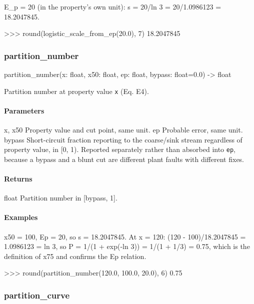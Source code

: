 \documentclass[10pt,a4paper,twoside]{report}
\begin{document}
E\_p = 20 (in the property's own unit): s = 20/ln 3 = 20/1.0986123 = 18.2047845.

\begin{doctestblock}
>>> round(logistic_scale_from_ep(20.0), 7)
18.2047845
\end{doctestblock}

\subsubsection*{partition\_number}

\begin{verbatimsmall}
partition_number(x: float, x50: float, ep: float, bypass: float=0.0) -> float
\end{verbatimsmall}

Partition number at property value \texttt{x} (Eq. E4).

\paragraph*{Parameters}

x, x50 Property value and cut point, same unit. ep Probable error, same unit. bypass Short-circuit fraction reporting to the coarse/sink stream regardless of property value, in [0, 1). Reported separately rather than absorbed into \texttt{ep}, because a bypass and a blunt cut are different plant faults with different fixes.

\paragraph*{Returns}

float Partition number in [bypass, 1].

\paragraph*{Examples}

x50 = 100, Ep = 20, so s = 18.2047845. At x = 120: (120 - 100)/18.2047845 = 1.0986123 = ln 3, so P = 1/(1 + exp(-ln 3)) = 1/(1 + 1/3) = 0.75, which is the definition of x75 and confirms the Ep relation.

\begin{doctestblock}
>>> round(partition_number(120.0, 100.0, 20.0), 6)
0.75
\end{doctestblock}

\subsubsection*{partition\_curve}
\end{document}
